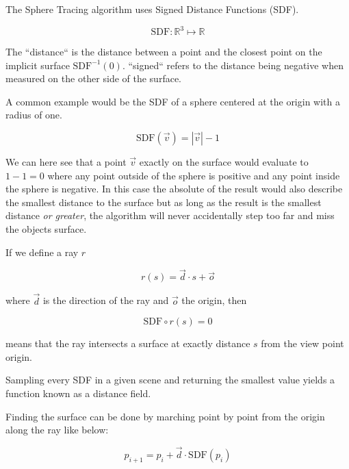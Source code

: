 		The Sphere Tracing algorithm uses Signed Distance Functions (SDF).
		
		$$\text{SDF}:\mathbb{R}^{3}\mapsto\mathbb{R}$$ 
		
		The ``distance`` is the distance between a point and the closest point on
		the implicit surface $\text{SDF}^{-1}(0)$. ``signed`` refers to the
		distance being negative when measured on the other side of the surface. 

		A common example would be the SDF of a sphere centered at the origin with a
		radius of one. 
		
		$$\text{SDF}(\vec{v}) = |\vec{v}| - 1$$
		
		We can here see that a point $\vec{v}$ exactly on the surface would
		evaluate to $1 - 1 = 0$ where any point outside of the sphere is positive
		and any point inside the sphere is negative. In this case the absolute of
		the result would also describe the smallest distance to the surface but as
		long as the result is the smallest distance \emph{or greater}, the
		algorithm will never accidentally step too far and miss the objects
		surface. 

		If we define a ray $r$ 
		
		$$r(s) = \vec{d} \cdot s + \vec{o}$$

		where $\vec{d}$ is the direction of the ray and $\vec{o}$ the origin, then
		
		$$\text{SDF}\circ r(s) = 0$$
		
		means that the ray intersects a surface at exactly distance $s$ from the
		view point origin. 
		

		Sampling every SDF in a given scene and returning the
		smallest value yields a function known as a distance field.


		\bigskip \noindent Finding the surface can be done by marching point by
		point from the origin along the ray like below: 
		
		$$p_{i+1} = p_i + \vec{d}\cdot \text{SDF}(p_i)$$ 
		
